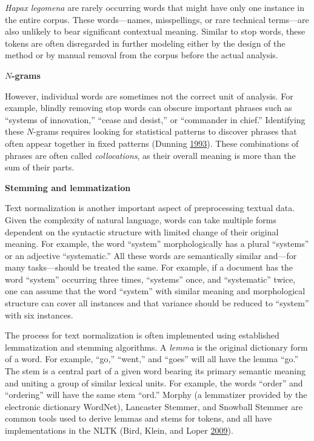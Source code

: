 \documentclass[]{krantz}
\begin{document}
\emph{Hapax legomena} are rarely occurring words that might have only
one instance in the entire corpus. These words---names, misspellings, or
rare technical terms---are also unlikely to bear significant contextual
meaning. Similar to stop words, these tokens are often disregarded in
further modeling either by the design of the method or by manual removal
from the corpus before the actual analysis.

\textbf{\(N\)-grams}

However, individual words are sometimes not the correct unit of
analysis. For example, blindly removing stop words can obscure important
phrases such as ``systems of innovation,'' ``cease and desist,'' or
``commander in chief.'' Identifying these \(N\)-grams requires looking
for statistical patterns to discover phrases that often appear together
in fixed patterns (Dunning \protect\hyperlink{ref-Dunning-93}{1993}).
These combinations of phrases are often called \emph{collocations}, as
their overall meaning is more than the sum of their parts.

\textbf{Stemming and lemmatization}

Text normalization is another important aspect of preprocessing textual
data. Given the complexity of natural language, words can take multiple
forms dependent on the syntactic structure with limited change of their
original meaning. For example, the word ``system'' morphologically has a
plural ``systems'' or an adjective ``systematic.'' All these words are
semantically similar and---for many tasks---should be treated the same.
For example, if a document has the word ``system'' occurring three
times, ``systems'' once, and ``systematic'' twice, one can assume that
the word ``system'' with similar meaning and morphological structure can
cover all instances and that variance should be reduced to ``system''
with six instances.

The process for text normalization is often implemented using
established lemmatization and stemming algorithms. A \emph{lemma} is the
original dictionary form of a word. For example, ``go,'' ``went,'' and
``goes'' will all have the lemma ``go.'' The stem is a central part of a
given word bearing its primary semantic meaning and uniting a group of
similar lexical units. For example, the words ``order'' and ``ordering''
will have the same stem ``ord.'' Morphy (a lemmatizer provided by the
electronic dictionary WordNet), Lancaster Stemmer, and Snowball Stemmer
are common tools used to derive lemmas and stems for tokens, and all
have implementations in the NLTK (Bird, Klein, and Loper
\protect\hyperlink{ref-bird-09}{2009}).
\end{document}
